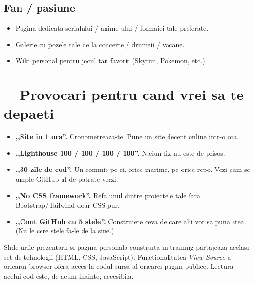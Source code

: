 \subsection*{Fan / pasiune}

\begin{itemize}[itemsep=2pt]
  \item Pagina dedicata serialului / anime-ului / formaiei tale preferate.
  \item Galerie cu pozele tale de la concerte / drumeii / vacane.
  \item Wiki personal pentru jocul tau favorit (Skyrim, Pokemon, etc.).
\end{itemize}

\section{\faTrophy\ \ Provocari pentru cand vrei sa te depaeti}

\begin{itemize}[itemsep=2pt]
  \item \textbf{,,Site in 1 ora''.} Cronometreaza-te. Pune un site decent online intr-o ora.
  \item \textbf{,,Lighthouse 100 / 100 / 100 / 100''.} Niciun fix nu este de prisos.
  \item \textbf{,,30 zile de cod''.} Un commit pe zi, orice marime, pe orice repo. Vezi cum se umple GitHub-ul de patrate verzi.
  \item \textbf{,,No CSS framework''.} Refa unul dintre proiectele tale fara Bootstrap/Tailwind \textendash{} doar CSS pur.
  \item \textbf{,,Cont GitHub cu 5 stele''.} Construiete ceva de care alii vor sa puna stea. (Nu le cere stele \textendash{} fa-le de la sine.)
\end{itemize}

\partdivider

\begin{recap}
Slide-urile prezentarii si pagina personala construita in training partajeaza acelasi set de tehnologii (HTML, CSS, JavaScript). Functionalitatea \emph{View Source} a oricarui browser ofera acces la codul sursa al oricarei pagini publice. Lectura acelui cod este, de acum inainte, accesibila.
\end{recap}

